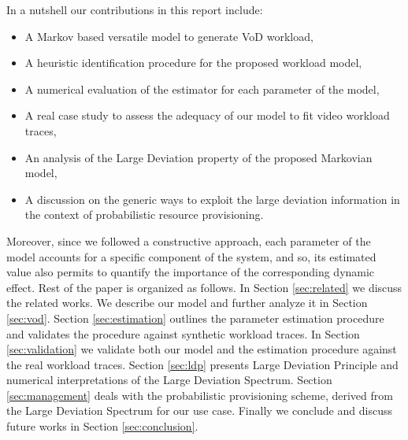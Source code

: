 \documentclass[twoside]{article}
\newcommand{\roy}[2]{#2}
\begin{document}
In a nutshell our contributions in this report include: 
\begin{itemize}
\item A Markov based versatile model to generate VoD workload, 
\item A heuristic identification procedure for the proposed workload model, 
\item A numerical evaluation of the estimator \roy{of}{for} each parameter\roy{s}{} of the model,
\item A real case study to assess the adequacy of our model to fit video workload traces,
\item An analysis of the Large Deviation property of the proposed Markovian model,
\item A discussion on the generic ways to exploit the large deviation information in the context of probabilistic resource provisioning.
\end{itemize}
Moreover, since we followed a constructive approach, each parameter of the model accounts for a specific component of the system, and so, its estimated value also permits to quantify the importance of the corresponding dynamic effect.\newline
Rest of the paper is organized as follows. In Section \ref{sec:related} we discuss the related works. We describe our model and further analyze it in Section \ref{sec:vod}. Section \ref{sec:estimation} outlines the parameter estimation procedure and validates the procedure against synthetic workload traces. In Section \ref{sec:validation} we validate both our model and the estimation procedure against the real workload traces. Section \ref{sec:ldp} presents Large Deviation Principle and numerical interpretations of the Large Deviation Spectrum. Section \ref{sec:management} deals with the probabilistic provisioning scheme, derived from the Large Deviation Spectrum for our use case. Finally we conclude and discuss future works in Section \ref{sec:conclusion}.\newpage
\end{document}
